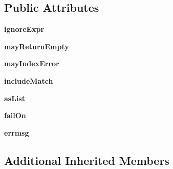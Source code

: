\subsection*{Public Attributes}
\begin{DoxyCompactItemize}
\item 
\mbox{\label{classpkg__resources_1_1__vendor_1_1pyparsing_1_1_skip_to_aba87387b4e4ff66d7c6ac2f62a1131dd}} 
{\bfseries ignore\+Expr}
\item 
\mbox{\label{classpkg__resources_1_1__vendor_1_1pyparsing_1_1_skip_to_ae89db83bfd10c2c9e91772eeda635f19}} 
{\bfseries may\+Return\+Empty}
\item 
\mbox{\label{classpkg__resources_1_1__vendor_1_1pyparsing_1_1_skip_to_af25363e9ca3be339000f3667551f23ba}} 
{\bfseries may\+Index\+Error}
\item 
\mbox{\label{classpkg__resources_1_1__vendor_1_1pyparsing_1_1_skip_to_a43982812393206782d23d1c80fb07e3f}} 
{\bfseries include\+Match}
\item 
\mbox{\label{classpkg__resources_1_1__vendor_1_1pyparsing_1_1_skip_to_ae8cbae4460fd18f02f8441ec5ef6a05d}} 
{\bfseries as\+List}
\item 
\mbox{\label{classpkg__resources_1_1__vendor_1_1pyparsing_1_1_skip_to_a64bd202f0a1574332177d81d6f1c7f16}} 
{\bfseries fail\+On}
\item 
\mbox{\label{classpkg__resources_1_1__vendor_1_1pyparsing_1_1_skip_to_ab5fabcbd146159871d9234ba7d46058c}} 
{\bfseries errmsg}
\end{DoxyCompactItemize}
\subsection*{Additional Inherited Members}


